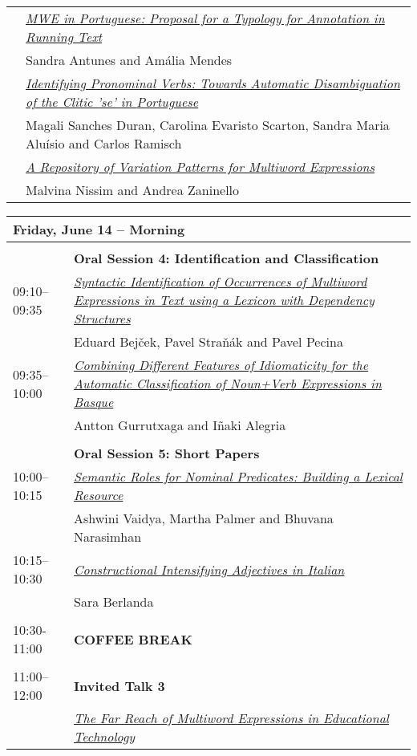 \begin{tabular}{p{20mm}p{138mm}}
 & \hyperlink{page.87}{\em MWE in Portuguese: Proposal for a Typology  for Annotation in Running Text}\\
         & Sandra Antunes and Am\'{a}lia Mendes \\
 & \hyperlink{page.93}{\em Identifying Pronominal Verbs: Towards Automatic Disambiguation of the Clitic 'se' in {P}ortuguese}\\
         & Magali Sanches Duran, Carolina Evaristo Scarton, Sandra Maria Alu\'{i}sio and Carlos Ramisch \\
 & \hyperlink{page.101}{\em A Repository of Variation Patterns for Multiword Expressions}\\
         & Malvina Nissim and Andrea Zaninello \\
\end{tabular}
\newpage
\begin{tabular}{p{20mm}p{138mm}}
\hline
\multicolumn{2}{l}{\bf Friday, June 14 -- Morning} \\
\hline
\\
 & {\bf Oral Session 4: Identification and Classification} \\
09:10--09:35 & \hyperlink{page.106}{\em Syntactic Identification of Occurrences of Multiword Expressions in Text using a Lexicon with Dependency Structures}\\
         & Eduard Bej\v{c}ek, Pavel Stra\v{n}\'{a}k and Pavel Pecina \\
09:35--10:00 & \hyperlink{page.116}{\em Combining Different Features of Idiomaticity for the Automatic Classification of Noun+Verb Expressions in {B}asque}\\
         & Antton Gurrutxaga and I\~{n}aki Alegria \\
\\
 & {\bf Oral Session 5: Short Papers} \\
10:00--10:15 & \hyperlink{page.126}{\em Semantic Roles for Nominal Predicates: Building a Lexical Resource}\\
         & Ashwini Vaidya, Martha Palmer and Bhuvana Narasimhan \\
10:15--10:30 & \hyperlink{page.132}{\em Constructional Intensifying Adjectives in {I}talian}\\
         & Sara Berlanda \\
\\
10:30-11:00 & {\bf COFFEE BREAK} \\
\\
11:00--12:00 & {\bf Invited Talk 3} \\
 & \hyperlink{page.138}{\em The Far Reach of Multiword Expressions in Educational Technology}\\

\end{tabular}
